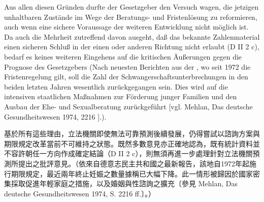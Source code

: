 \documentclass[12pt]{article}
\begin{document}
\syncleft
\begin{sourcepara}
Aus allen diesen Gründen durfte der Gesetzgeber den Versuch wagen, die jetzigen unhaltbaren Zustände im Wege der Beratungs- und Fristenlösung zu reformieren, auch wenn eine sichere Voraussage der weiteren Entwicklung nicht möglich ist. Da auch die Mehrheit zutreffend davon ausgeht, daß das bekannte Zahlenmaterial einen sicheren Schluß in der einen oder anderen Richtung nicht erlaubt (D II 2 c), bedarf es keines weiteren Eingehens auf die kritischen Äußerungen gegen die Prognose des Gesetzgebers (Nach neuesten Berichten aus der \abbrDDR{}, wo seit 1972 die Fristenregelung gilt, soll die Zahl der Schwangerschaftsunterbrechungen in den beiden letzten Jahren wesentlich zurückgegangen sein. Dies wird auf die intensiven staatlichen Maßnahmen zur Förderung junger Familien und den Ausbau der Ehe- und Sexualberatung zurückgeführt [vgl. Mehlan, Das deutsche Gesundheitswesen 1974, \abbrS{} 2216 \abbrFF{}].).
\end{sourcepara}
\begin{transpara}
基於所有這些理由，立法機關即使無法可靠預測後續發展，仍得嘗試以諮詢方案與期限規定改革當前不可維持之狀態。既然多數意見亦正確地認為，既有統計資料並不容許朝任一方向作成確定結論（D II 2 c），則無須再進一步處理針對立法機關預測所提出之批評意見。（依來自德意志民主共和國之最新報告，該地自1972年起施行期限規定，最近兩年終止妊娠之數量據稱已大幅下降。此一情形被歸因於國家密集採取促進年輕家庭之措施，以及婚姻與性諮詢之擴充〔參見 Mehlan, Das deutsche Gesundheitswesen 1974, S. 2216 ff.〕。）
\end{transpara}
\end{document}
